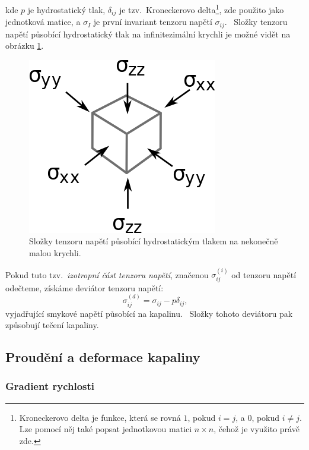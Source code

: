 \documentclass[12pt]{article}
\begin{document}
kde $p$ je hydrostatický tlak, $\delta_{ij}$ je tzv.~Kroneckerovo delta\footnote{Kroneckerovo delta je funkce, která se rovná $1$, pokud $i = j$, a $0$, pokud $i \neq j$. Lze pomocí něj také popsat jednotkovou matici $n \times n$, čehož je využito právě zde.}, zde použito jako jednotková matice, a $\sigma_I$ je první invariant tenzoru napětí $\sigma_{ij}$.~\cite{material:Hydrostatika_a_hydrodynamika}\cite{wiki:Kroneckerovo_delta}\cite{wiki:Identity_matrix}
Složky tenzoru napětí působící hydrostatický tlak na infinitezimální krychli je možné vidět na obrázku \ref{fig:tlak}.

\begin{figure}
    \centering
    \includegraphics[width = 0.3\linewidth]{figures/Hydrostatic_Stress.png}
    \caption{Složky tenzoru napětí působící hydrostatickým tlakem na nekonečně malou krychli.~\cite{Figure:hydrostatický_tlak}}
    \label{fig:tlak}
\end{figure}

Pokud tuto tzv.~\emph{izotropní část tenzoru napětí}, značenou $\sigma_{ij}^{(i)}$ od tenzoru napětí odečteme, získáme deviátor tenzoru napětí:
\begin{equation}
    \sigma_{ij}^{(d)} = \sigma_{ij} - p\delta_{ij}\text{,}
\end{equation}
vyjadřující smykové napětí působící na kapalinu.~\cite{online:Skripta_deviátor}\cite{wiki:Deformace} Složky tohoto deviátoru pak způsobují tečení kapaliny.

\subsection{Proudění a deformace kapaliny}%

\subsubsection{Gradient rychlosti}%
\end{document}
